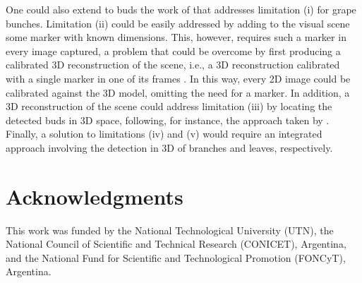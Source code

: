 \documentclass[a4paper,authoryear,review]{elsarticle}
\begin{document}
One could also extend to buds the work of \citet{santos2020grape} that addresses limitation (i) for grape bunches. Limitation (ii) could be easily addressed by adding to the visual scene some marker with known dimensions. This, however, requires such a marker in every image captured, a problem that could be overcome by first producing a calibrated 3D reconstruction of the scene, i.e., a 3D reconstruction calibrated with a single marker in one of its frames \citep{hartley2003multiple, moons20093d}. In this way, every 2D image could be calibrated against the 3D model, omitting the need for a marker. In addition, a 3D reconstruction of the scene could address limitation (iii) by locating the detected buds in 3D space, following, for instance, the approach taken by \citet{diaz2018grapevine}. Finally, a solution to limitations (iv) and (v) would require an integrated approach involving the detection in 3D of branches and leaves, respectively. 

\section*{Acknowledgments}

This work was funded by the National Technological University (UTN), the National Council of Scientific and Technical Research (CONICET), Argentina, and the National Fund for Scientific and Technological Promotion (FONCyT), Argentina.


\end{document}
